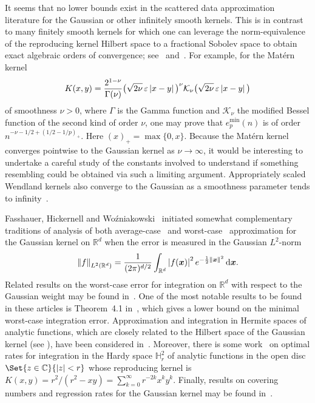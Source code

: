 \documentclass{mcom-l}
\numberwithin{equation}{section}
\numberwithin{theorem}{section} %
\renewcommand{\b}[1]{\bm{#1}}
\newcommand{\R}{\mathbb{R}} %
\begin{document}
It seems that no lower bounds exist in the scattered data approximation literature for the Gaussian or other infinitely smooth kernels.
This is in contrast to many finitely smooth kernels for which one can leverage the norm-equivalence of the reproducing kernel Hilbert space to a fractional Sobolev space to obtain exact algebraic orders of convergence; see~\cite{NovakTriebel2006, Arcangeli2007} and~\cite[Sec.\@~11.6]{Wendland2005}.
For example, for the Matérn kernel
\begin{equation*}
  K(x, y) = \frac{2^{1-\nu}}{\Gamma(\nu)} \big( \sqrt{2\nu} \, \varepsilon \abs[0]{x - y} \big)^\nu \mathcal{K}_\nu \big( \sqrt{2\nu} \, \varepsilon \abs[0]{x - y} \big)
\end{equation*}
of smoothness $\nu > 0$, where $\Gamma$ is the Gamma function and $\mathcal{K}_\nu$ the modified Bessel function of the second kind of order $\nu$, one may prove that $e_p^{\min}(n)$ is of order $n^{-\nu - 1/2 + (1/2 - 1/p)_+}$.
Here $(x)_+ = \max\{0, x\}$.
Because the Matérn kernel converges pointwise to the Gaussian kernel as $\nu \to \infty$, it would be interesting to undertake a careful study of the constants involved to understand if something resembling  could be obtained via such a limiting argument.
Appropriately scaled Wendland kernels also converge to the Gaussian as a smoothness parameter tends to infinity~\cite{Chernih2014}.

Fasshauer, Hickernell and Wo{\'z}niakowski~\cite{FasshauerHickernell2010} initiated somewhat complementary traditions of analysis of both average-case~\cite{FasshauerHickernell2010, ChenWang2019, KhartovLimar2022} and worst-case~\cite{FasshauerHickernell2012, SloanWozniakowski2018} approximation for the Gaussian kernel on $\R^d$ when the error is measured in the Gaussian $L^2$-norm
\begin{equation*}
  \norm[0]{f}_{L^2(\R^d)} = \frac{1}{(2\pi)^{d/2}} \int_{\R^d} \abs[0]{f(\b{x})}^2 e^{-\frac{1}{2} \norm[0]{\b{x}}^2} \dif \b{x}.
\end{equation*}
Related results on the worst-case error for integration on $\R^d$ with respect to the Gaussian weight may be found in~\cite{KuoWozniakowski2012, KuoSloanWozniakowski2017, Karvonen2019, Karvonen2021}.
One of the most notable results to be found in these articles is Theorem~4.1 in~\cite{KuoSloanWozniakowski2017}, which gives a lower bound on the minimal worst-case integration error.
Approximation and integration in Hermite spaces of analytic functions, which are closely related to the Hilbert space of the Gaussian kernel (see ), have been considered in~\cite{Irrgeher2015, Irrgeher2016}.
Moreover, there is some work~\cite{AnderssonBojanov1984} on optimal rates for integration in the Hardy space $\mathbb{H}_r^2$ of analytic functions in the open disc $\Set{z \in \mathbb{C}}{ \abs[0]{z} < r}$ whose reproducing kernel is $K(x, y) = r^2/(r^2 - xy) = \sum_{k=0}^\infty r^{-2k} x^k y^k$.
Finally, results on covering numbers and regression rates for the Gaussian kernel may be found in~\cite{Zhou2002, Zhou2003, VaartZanten2009, Kuhn2011, EbertsSteinwart2013, SteinwartFischer2021}.
\end{document}
